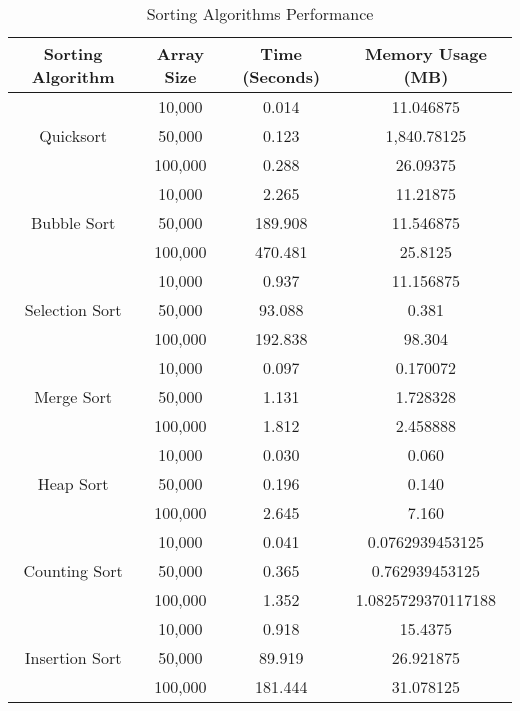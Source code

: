 \documentclass{article}
\begin{document}
\begin{table}[h]
    \centering
    \caption{Sorting Algorithms Performance}
    \label{tab:sorting-performance}
    \begin{tabular}{cccc}
        \toprule
        \textbf{Sorting Algorithm} & \textbf{Array Size} & \textbf{Time (Seconds)} & \textbf{Memory Usage (MB)} \\
        \midrule
        \multirow{3}{*}{Quicksort} & 10,000 & 0.014 & 11.046875 \\
        & 50,000 & 0.123 & 1,840.78125 \\
        & 100,000 & 0.288 & 26.09375 \\
        \midrule
        \multirow{3}{*}{Bubble Sort} & 10,000 & 2.265 & 11.21875 \\
        & 50,000 & 189.908 & 11.546875 \\
        & 100,000 & 470.481 & 25.8125 \\
        \midrule
        \multirow{3}{*}{Selection Sort} & 10,000 & 0.937 & 11.156875 \\
        & 50,000 & 93.088 & 0.381 \\
        & 100,000 & 192.838 & 98.304 \\
        \midrule
        \multirow{3}{*}{Merge Sort} & 10,000 & 0.097 & 0.170072 \\
        & 50,000 & 1.131 & 1.728328 \\
        & 100,000 & 1.812 & 2.458888 \\
        \midrule
        \multirow{3}{*}{Heap Sort} & 10,000 & 0.030 & 0.060 \\
        & 50,000 & 0.196 & 0.140 \\
        & 100,000 & 2.645 & 7.160 \\
        \midrule
        \multirow{3}{*}{Counting Sort} & 10,000 & 0.041 & 0.0762939453125 \\
        & 50,000 & 0.365 & 0.762939453125 \\
        & 100,000 & 1.352 & 1.0825729370117188 \\
        \midrule
        \multirow{3}{*}{Insertion Sort} & 10,000 & 0.918 & 15.4375 \\
        & 50,000 & 89.919 & 26.921875 \\
        & 100,000 & 181.444 & 31.078125 \\
        \bottomrule
    \end{tabular}
\end{table}

\newpage


\end{document}
